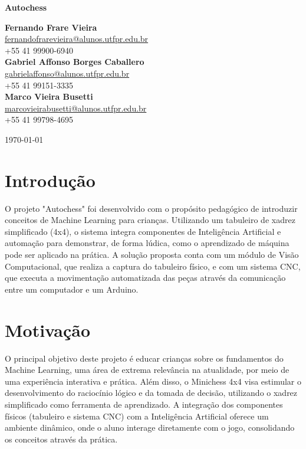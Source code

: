 \documentclass[a4paper,12pt]{article}
\date{\today}
\begin{document}
  

\vspace{1em}  
\begin{center}  
    \Large\textbf{Autochess}  
\end{center}  

\vspace{1em}  

\begin{center}  
    \textbf{Fernando Frare Vieira} \\  
    \href{mailto:fernandofrarevieira@alunos.utfpr.edu.br}{fernandofrarevieira@alunos.utfpr.edu.br} \\  
    +55 41 99900-6940 \\[1.5em]  
    \textbf{Gabriel Affonso Borges Caballero} \\  
    \href{mailto:gabrielaffonso@alunos.utfpr.edu.br}{gabrielaffonso@alunos.utfpr.edu.br} \\  
    +55 41 99151-3335\\[1.5em]  
    \textbf{Marco Vieira Busetti} \\  
    \href{mailto:marcovieirabusetti@alunos.utfpr.edu.br}{marcovieirabusetti@alunos.utfpr.edu.br} \\  
    +55 41 99798-4695  
\end{center}  

\vspace{1em}  
\begin{center}  
    \today  
\end{center}  
\vspace{2em}  

\section{Introdução}  
O projeto "Autochess" \; foi desenvolvido com o propósito pedagógico de introduzir conceitos de Machine Learning para crianças. Utilizando um tabuleiro de xadrez simplificado (4x4), o sistema integra componentes de Inteligência Artificial e automação para demonstrar, de forma lúdica, como o aprendizado de máquina pode ser aplicado na prática. A solução proposta conta com um módulo de Visão Computacional, que realiza a captura do tabuleiro físico, e com um sistema CNC, que executa a movimentação automatizada das peças através da comunicação entre um computador e um Arduino.  

\section{Motivação}  
O principal objetivo deste projeto é educar crianças sobre os fundamentos do Machine Learning, uma área de extrema relevância na atualidade, por meio de uma experiência interativa e prática. Além disso, o Minichess 4x4 visa estimular o desenvolvimento do raciocínio lógico e da tomada de decisão, utilizando o xadrez simplificado como ferramenta de aprendizado. A integração dos componentes físicos (tabuleiro e sistema CNC) com a Inteligência Artificial oferece um ambiente dinâmico, onde o aluno interage diretamente com o jogo, consolidando os conceitos através da prática.  
\end{document}
